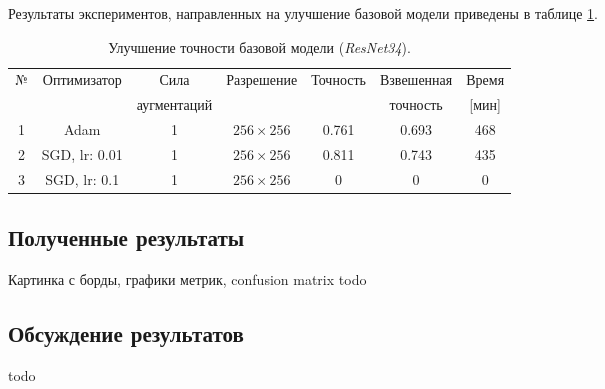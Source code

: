Результаты экспериментов, направленных на улучшение базовой модели
приведены в таблице \ref{tabular: train_tricks}.


\begin{table}[h]
    \begin{center}
        \begin{tabular}{c | c| c | c | c| c| c}
            \hline
            № & Оптимизатор & Сила & Разрешение & Точность & Взвешенная  & Время \\
            & & аугментаций & & & точность & [мин] \\
            \hline
    
           1 & Adam & 1 & $256 \times 256$ & 0.761 & 0.693 & 468 \\
           
           2 & SGD, lr: 0.01 & 1 & $256 \times 256 $ & 0.811 & 0.743 & 435 \\
           
           3 & SGD, lr: 0.1 & 1 & $256 \times 256 $ & 0 & 0 & 0 \\
               
            \hline
        \end{tabular}
    \end{center}
    \caption{Улучшение точности базовой модели (\textit{ResNet34}).}
    \label{tabular: train_tricks}
\end{table}



\subsection{Полученные результаты}
Картинка с борды, графики метрик, confusion matrix todo



\subsection{Обсуждение результатов}
todo

